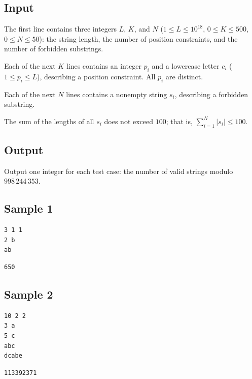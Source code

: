 \subsection{Input}

The first line contains three integers $L$, $K$, and $N$ ($1 \le L \le 10^{18}$, $0 \le K \le 500$, $0 \le N \le 50$): the string length, the number of position constraints, and the number of forbidden substrings.

Each of the next $K$ lines contains an integer $p_i$ and a lowercase letter $c_i$ ($1 \le p_i \le L$), describing a position constraint. All $p_i$ are distinct.

Each of the next $N$ lines contains a nonempty string $s_i$, describing a forbidden substring.

The sum of the lengths of all $s_i$ does not exceed $100$; that is, $\sum_{i=1}^N \vert{}s_i\vert{} \le 100$.

\subsection{Output}

Output one integer for each test case: the number of valid strings modulo $998\,244\,353$.

\subsection{Sample 1}

\begin{minipage}{\linewidth}
	\begin{minipage}[t]{0.49\linewidth}
		\begin{lstlisting}[title=\texttt{standard input}]
3 1 1
2 b
ab
\end{lstlisting}
	\end{minipage}
	\begin{minipage}[t]{0.49\linewidth}
		\begin{lstlisting}[title=\texttt{standard output}]
650
\end{lstlisting}
	\end{minipage}
\end{minipage}

\subsection{Sample 2}

\begin{minipage}{\linewidth}
	\begin{minipage}[t]{0.49\linewidth}
		\begin{lstlisting}[title=\texttt{standard input}]
10 2 2
3 a
5 c
abc
dcabe
\end{lstlisting}
	\end{minipage}
	\begin{minipage}[t]{0.49\linewidth}
		\begin{lstlisting}[title=\texttt{standard output}]
113392371
\end{lstlisting}
	\end{minipage}
\end{minipage}


